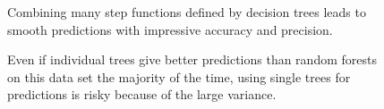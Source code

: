 \documentclass[
  12pt,
  letterpaper,
  DIV=11,
  numbers=noendperiod]{scrartcl}
\begin{document}
\begin{figure}[H]


\caption{\label{fig-sim1-rf-fit}Combining many step functions defined by
decision trees leads to smooth predictions with impressive accuracy and
precision.}

\end{figure}%

\begin{figure}[H]


\caption{\label{fig-sim1-mse}Even if individual trees give better
predictions than random forests on this data set the majority of the
time, using single trees for predictions is risky because of the large
variance.}

\end{figure}%
\end{document}
